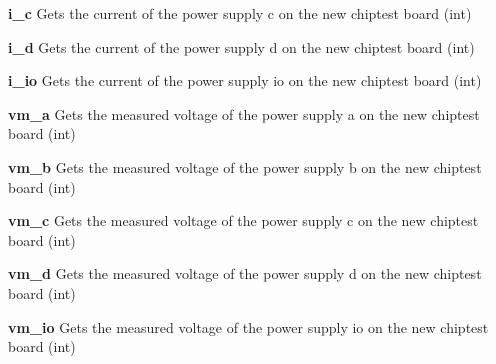 \begin{DoxyItemize}
\item {\bfseries i\_\-c} Gets the current of the power supply c on the new chiptest board (int)
\end{DoxyItemize}


\begin{DoxyItemize}
\item {\bfseries i\_\-d} Gets the current of the power supply d on the new chiptest board (int)
\end{DoxyItemize}


\begin{DoxyItemize}
\item {\bfseries i\_\-io} Gets the current of the power supply io on the new chiptest board (int)
\end{DoxyItemize}


\begin{DoxyItemize}
\item {\bfseries vm\_\-a} Gets the measured voltage of the power supply a on the new chiptest board (int)
\end{DoxyItemize}


\begin{DoxyItemize}
\item {\bfseries vm\_\-b} Gets the measured voltage of the power supply b on the new chiptest board (int)
\end{DoxyItemize}


\begin{DoxyItemize}
\item {\bfseries vm\_\-c} Gets the measured voltage of the power supply c on the new chiptest board (int)
\end{DoxyItemize}


\begin{DoxyItemize}
\item {\bfseries vm\_\-d} Gets the measured voltage of the power supply d on the new chiptest board (int)
\end{DoxyItemize}


\begin{DoxyItemize}
\item {\bfseries vm\_\-io} Gets the measured voltage of the power supply io on the new chiptest board (int) 
\end{DoxyItemize}